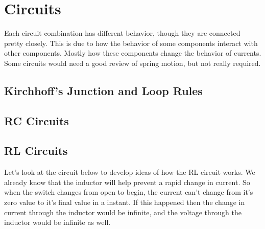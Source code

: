 \chapter{Circuits}
Each circuit combination has different behavior, though they are connected pretty closely. This is due to how the behavior of some components interact with other components. Mostly how these components change the behavior of currents. Some circuits would need a good review of spring motion, but not really required. 


\section{Kirchhoff's Junction and Loop Rules}
\section{RC Circuits}

\pagebreak
\section{RL Circuits}
Let's look at the circuit below to develop ideas of how the RL circuit works. We already know that the inductor will help prevent a rapid change in current. So when the switch changes from open to begin, the current can't change from it's zero value to it's final value in a instant. If this happened then the change in current through the inductor would be infinite, and the voltage through the inductor would be infinite as well.


